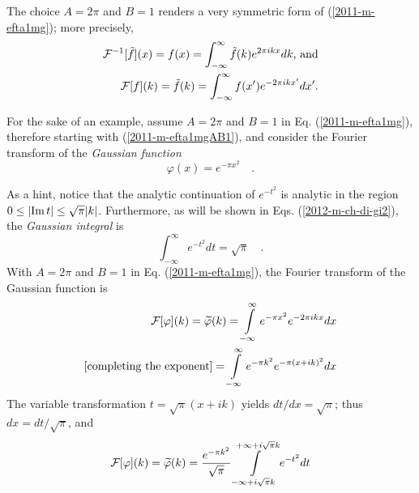 The choice $A=2\pi $ and $B=1$ renders a very symmetric form of (\ref{2011-m-efta1mg}); more precisely,
\begin{equation}
\begin{split}
 {\cal F}^{-1}[\tilde{f}](x)=f(x)=   \int_{-\infty}^\infty \tilde{f}(k) e^{  2\pi i{kx}} dk \textrm{, and} \\
 {\cal F}[f](k)=\tilde{f}(k)=    \int_{-\infty}^\infty  f(x') e^{-  2\pi  i {kx'}} dx'
.
\end{split}
\label{2011-m-efta1mgAB1}
\end{equation}

{
\color{blue}
\bexample


For the sake of an example,
assume $A=2\pi $ and $B=1$  in Eq. (\ref{2011-m-efta1mg}), therefore starting with (\ref{2011-m-efta1mgAB1}),
and consider the  Fourier transform of the  {\em Gaussian function}
\begin{equation}
\varphi (x)= e^{-\pi x^2}  \quad .
\label{2012-m-ch-fa-gaussian}
\end{equation}


As a hint, notice that
the analytic continuation of $e^{-t^2}$ is analytic in the region $0\le \vert {\rm Im}\,t\vert \le \sqrt{\pi }\vert k \vert$.
Furthermore, as will be shown in Eqs. (\ref{2012-m-ch-di-gi2}), the {\em Gaussian integral}
 is
\begin{equation}
\int_{-\infty}^\infty
 e^{-t^2} dt =\sqrt{\pi }\quad .
\end{equation}
With $A=2\pi $ and $B=1$  in Eq. (\ref{2011-m-efta1mg}), the Fourier transform of the  Gaussian function is
\begin{equation}
\begin{split}
    {\cal F}[\varphi  ](k)=\widetilde{ \varphi} (k) =  \int\limits_{-\infty}^\infty
                 e^{-\pi  x^2}  e^{- 2\pi ikx} dx
\\
\textrm{[completing the exponent]}
              =
\int\limits_{-\infty}^\infty
                 e^{-{\pi  k^2}}e^{-\pi \left(x+{i}k\right)^2}   dx
\end{split}
\end{equation}
The variable transformation  $t=\sqrt{\pi} (x + {i}k) $
yields
$dt/ dx=\sqrt{\pi} $; thus $dx = dt/ \sqrt{\pi}$, and
\begin{equation}
   {\cal F}[\varphi  ](k)=\widetilde{ \varphi} (k)=\frac{ e^{-{\pi k^2}}}{\sqrt{\pi} }
                 \int\limits_{-\infty+i\sqrt{\pi} {k}}^{+\infty+i\sqrt{\pi} {k}}
                 e^{-t^2}  dt
\label{2012-m-ch-dergauin1}
\end{equation}

}

